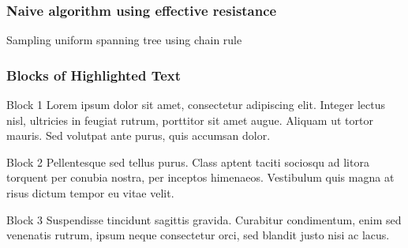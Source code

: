 \documentclass{beamer}
\begin{document}

\begin{frame}
\frametitle{Naive algorithm using effective resistance}



\begin{algorithm}[H]
 
 \caption{Sampling uniform spanning tree using chain rule}
\end{algorithm}


\end{frame}


\begin{frame}
\frametitle{Blocks of Highlighted Text}
\pause
\begin{block}{Block 1}
Lorem ipsum dolor sit amet, consectetur adipiscing elit. Integer lectus nisl, ultricies in feugiat rutrum, porttitor sit amet augue. Aliquam ut tortor mauris. Sed volutpat ante purus, quis accumsan dolor.
\end{block}
\pause
\begin{block}{Block 2}
Pellentesque sed tellus purus. Class aptent taciti sociosqu ad litora torquent per conubia nostra, per inceptos himenaeos. Vestibulum quis magna at risus dictum tempor eu vitae velit.
\end{block}
\pause
\begin{block}{Block 3}
Suspendisse tincidunt sagittis gravida. Curabitur condimentum, enim sed venenatis rutrum, ipsum neque consectetur orci, sed blandit justo nisi ac lacus.
\end{block}
\end{frame}

\end{document}
